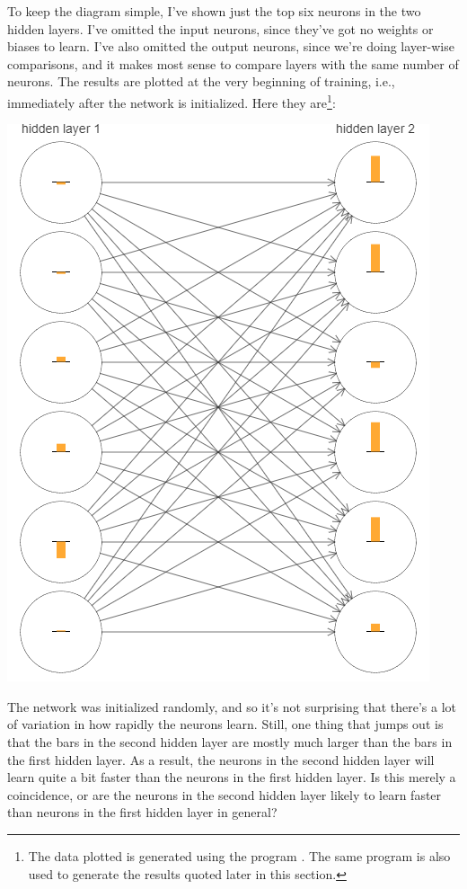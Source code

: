 \documentclass[a4paper,twoside,10pt]{book}
\begin{document}
To keep the diagram simple, I've shown just the top six neurons in the two hidden layers. I've omitted the input neurons, since they've got no weights or biases to learn. I've also omitted the output neurons, since we're doing layer-wise comparisons, and it makes most sense to compare layers with the same number of neurons. The results are plotted at the very beginning of training, i.e., immediately after the network is initialized. Here they are\footnote{The data plotted is generated using the program . The same program is also used to generate the results quoted later in this section.}:
\begin{center}
	\includegraphics[width=0.5\linewidth]{figures/ch5/tikz500}
\end{center}
The network was initialized randomly, and so it's not surprising that there's a lot of variation in how rapidly the neurons learn. Still, one thing that jumps out is that the bars in the second hidden layer are mostly much larger than the bars in the first hidden layer. As a result, the neurons in the second hidden layer will learn quite a bit faster than the neurons in the first hidden layer. Is this merely a coincidence, or are the neurons in the second hidden layer likely to learn faster than neurons in the first hidden layer in general?
%
\end{document}
